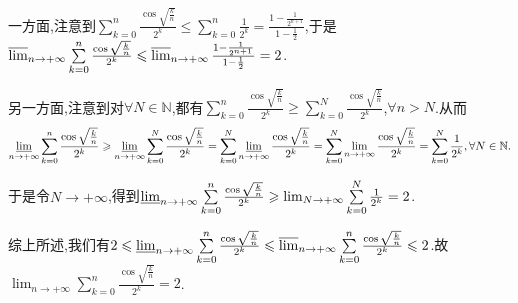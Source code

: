 \documentclass[../../main.tex]{subfiles}%
\begin{document}
\begin{solution}
一方面,注意到\(\sum\limits_{k = 0}^{n}\frac{\cos\sqrt{\frac{k}{n}}}{2^k} \leqslant \sum\limits_{k = 0}^{n}\frac{1}{2^k} = \frac{1 - \frac{1}{2^{n + 1}}}{1 - \frac{1}{2}}\),于是
$\varlimsup_{n \to +\infty}\sum\limits_{k = 0}^{n}\frac{\cos\sqrt{\frac{k}{n}}}{2^k} \leqslant \varlimsup_{n \to +\infty}\frac{1 - \frac{1}{2^{n + 1}}}{1 - \frac{1}{2}} = 2$.

另一方面,注意到对\(\forall N \in \mathbb{N}\),都有\(\sum\limits_{k = 0}^{n}\frac{\cos\sqrt{\frac{k}{n}}}{2^k} \geqslant \sum\limits_{k = 0}^{N}\frac{\cos\sqrt{\frac{k}{n}}}{2^k}\),$\forall n>N$.从而
\begin{align*}
\varliminf_{n \to +\infty}\sum\limits_{k = 0}^{n}\frac{\cos\sqrt{\frac{k}{n}}}{2^k} \geqslant \varliminf_{n \to +\infty}\sum\limits_{k = 0}^{N}\frac{\cos\sqrt{\frac{k}{n}}}{2^k} = \sum\limits_{k = 0}^{N}\varliminf_{n \to +\infty}\frac{\cos\sqrt{\frac{k}{n}}}{2^k} = \sum\limits_{k = 0}^{N}\lim_{n \to +\infty}\frac{\cos\sqrt{\frac{k}{n}}}{2^k} = \sum\limits_{k = 0}^{N}\frac{1}{2^k},\forall N \in \mathbb{N}.
\end{align*}

于是令\(N \to +\infty\),得到\(\varliminf_{n \to +\infty}\sum\limits_{k = 0}^{n}\frac{\cos\sqrt{\frac{k}{n}}}{2^k} \geqslant \lim_{N \to +\infty}\sum\limits_{k = 0}^{N}\frac{1}{2^k} = 2\).

综上所述,我们有\(2 \leqslant \varliminf_{n \to +\infty}\sum\limits_{k = 0}^{n}\frac{\cos\sqrt{\frac{k}{n}}}{2^k} \leqslant \varlimsup_{n \to +\infty}\sum\limits_{k = 0}^{n}\frac{\cos\sqrt{\frac{k}{n}}}{2^k} \leqslant 2\).故\(\lim_{n \to +\infty}\sum\limits_{k = 0}^{n}\frac{\cos\sqrt{\frac{k}{n}}}{2^k} = 2\). 

\end{solution}
\end{document}
